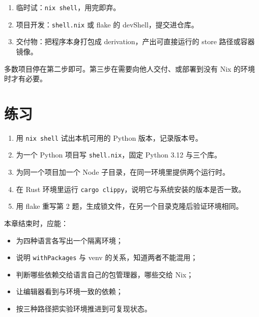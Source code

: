 \begin{enumerate}
  \item 临时试：\texttt{nix shell}，用完即弃。
  \item 项目开发：\texttt{shell.nix} 或 flake 的 devShell，提交进仓库。
  \item 交付物：把程序本身打包成 derivation，产出可直接运行的 store 路径或容器镜像。
\end{enumerate}

多数项目停在第二步即可。第三步在需要向他人交付、或部署到没有 Nix 的环境时才有必要。

\section{练习}

\begin{enumerate}
  \item 用 \texttt{nix shell} 试出本机可用的 Python 版本，记录版本号。
  \item 为一个 Python 项目写 \texttt{shell.nix}，固定 Python 3.12 与三个库。
  \item 为同一个项目加一个 Node 子目录，在同一环境里提供两个运行时。
  \item 在 Rust 环境里运行 \texttt{cargo clippy}，说明它与系统安装的版本是否一致。
  \item 用 flake 重写第 2 题，生成锁文件，在另一个目录克隆后验证环境相同。
\end{enumerate}

\begin{checkpoint}
本章结束时，应能：
\begin{itemize}
  \item 为四种语言各写出一个隔离环境；
  \item 说明 \texttt{withPackages} 与 venv 的关系，知道两者不能混用；
  \item 判断哪些依赖交给语言自己的包管理器，哪些交给 Nix；
  \item 让编辑器看到与环境一致的依赖；
  \item 按三种路径把实验环境推进到可复现状态。
\end{itemize}
\end{checkpoint}
